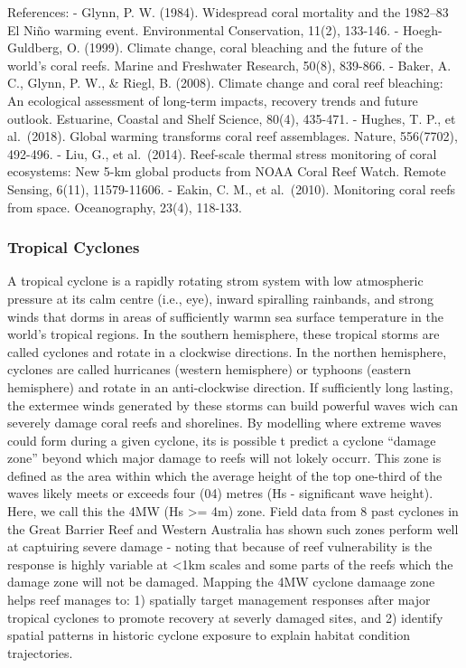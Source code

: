\documentclass[
  letterpaper,
  DIV=11,
  numbers=noendperiod]{scrartcl}
\begin{document}
References: - Glynn, P. W. (1984). Widespread coral mortality and the
1982--83 El Niño warming event. Environmental Conservation, 11(2),
133-146. - Hoegh-Guldberg, O. (1999). Climate change, coral bleaching
and the future of the world's coral reefs. Marine and Freshwater
Research, 50(8), 839-866. - Baker, A. C., Glynn, P. W., \& Riegl, B.
(2008). Climate change and coral reef bleaching: An ecological
assessment of long-term impacts, recovery trends and future outlook.
Estuarine, Coastal and Shelf Science, 80(4), 435-471. - Hughes, T. P.,
et al.~(2018). Global warming transforms coral reef assemblages. Nature,
556(7702), 492-496. - Liu, G., et al.~(2014). Reef-scale thermal stress
monitoring of coral ecosystems: New 5-km global products from NOAA Coral
Reef Watch. Remote Sensing, 6(11), 11579-11606. - Eakin, C. M., et
al.~(2010). Monitoring coral reefs from space. Oceanography, 23(4),
118-133.

\subsubsection{Tropical Cyclones}\label{tropical-cyclones}

A tropical cyclone is a rapidly rotating strom system with low
atmospheric pressure at its calm centre (i.e., eye), inward spiralling
rainbands, and strong winds that dorms in areas of sufficiently warmn
sea surface temperature in the world's tropical regions. In the southern
hemisphere, these tropical storms are called cyclones and rotate in a
clockwise directions. In the northen hemisphere, cyclones are called
hurricanes (western hemisphere) or typhoons (eastern hemisphere) and
rotate in an anti-clockwise direction. If sufficiently long lasting, the
extermee winds generated by these storms can build powerful waves wich
can severely damage coral reefs and shorelines. By modelling where
extreme waves could form during a given cyclone, its is possible t
predict a cyclone ``damage zone'' beyond which major damage to reefs
will not lokely occurr. This zone is defined as the area within which
the average height of the top one-third of the waves likely meets or
exceeds four (04) metres (Hs - significant wave height). Here, we call
this the 4MW (Hs \textgreater= 4m) zone. Field data from 8 past cyclones
in the Great Barrier Reef and Western Australia has shown such zones
perform well at captuiring severe damage - noting that because of reef
vulnerability is the response is highly variable at \textless1km scales
and some parts of the reefs which the damage zone will not be damaged.
Mapping the 4MW cyclone damaage zone helps reef manages to: 1) spatially
target management responses after major tropical cyclones to promote
recovery at severly damaged sites, and 2) identify spatial patterns in
historic cyclone exposure to explain habitat condition trajectories.
\end{document}
